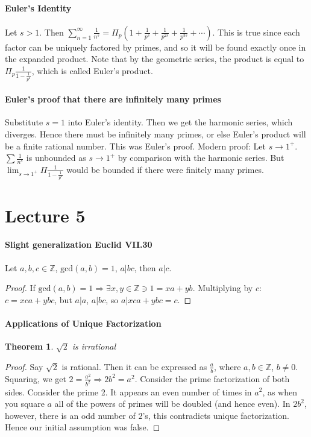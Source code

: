 \documentclass[10pt,letter]{article}
\theoremstyle{plain}
\newtheorem*{theorem*}{Theorem}
\theoremstyle{definition}
\begin{document}
\paragraph{Euler's Identity}
Let $s>1$. Then $\sum_{n=1}^\infty\frac{1}{n^s}=\Pi_{p}(1+\frac{1}{p^s}+\frac{1}{p^{2s}}+\frac{1}{p^{3s}}+\cdots)$. This is true since each factor can be uniquely factored by primes, and so it will be found exactly once in the expanded product. Note that by the geometric series, the product is equal to $\Pi_p\frac{1}{1-\frac{1}{p^2}}$, which is called Euler's product. 

\paragraph{Euler's proof that there are infinitely many primes}
Substitute $s=1$ into Euler's identity. Then we get the harmonic series, which diverges. Hence there must be infinitely many primes, or else Euler's product will be a finite rational number. This was Euler's proof. Modern proof: Let $s\rightarrow 1^+$. $\sum\frac{1}{n^s}$ is unbounded as $s\rightarrow1^+$ by comparison with the harmonic series. But $\lim_{s\rightarrow1^+}\Pi\frac{1}{1-\frac{1}{p^s}}$ would be bounded if there were finitely many primes. 


\section*{Lecture 5}
\paragraph{Slight generalization Euclid VII.30}
Let $a,b,c\in\mathbb{Z}$, $\text{gcd}(a,b)=1$, $a|bc$, then $a|c$.  
\begin{proof}
     If $\text{gcd}(a,b)=1\Rightarrow\exists x,y\in\mathbb{Z}\ni 1=xa+yb$. Multiplying by $c$: $c=xca+ybc$, but $a|a$, $a|bc$, so $a|xca+ybc=c$. 
\end{proof}

\paragraph{Applications of Unique Factorization}
\begin{theorem*}
     $\sqrt{2}$ is irrational
\end{theorem*}
\begin{proof}
     Say $\sqrt{2}$ is rational. Then it can be expressed as $\frac{a}{b}$, where $a,b\in\mathbb{Z}$, $b\neq0$. Squaring, we get $2=\frac{a^2}{b^2}\Rightarrow 2b^2=a^2$. Consider the prime factorization of both sides. Consider the prime 2. It appears an even number of times in $a^2$, as when you square $a$ all of the powers of primes will be doubled (and hence even). In $2b^2$, however, there is an odd number of $2$'s, this contradicts unique factorization. Hence our initial assumption was false. 
\end{proof}
\end{document}
